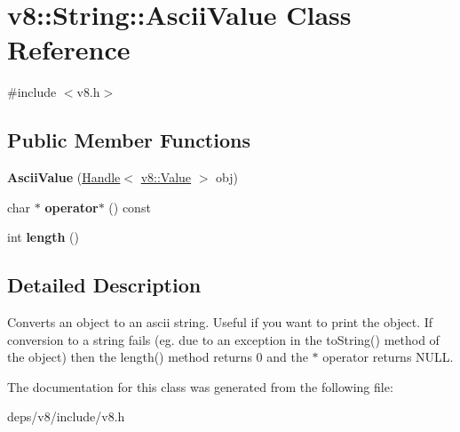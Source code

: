 \hypertarget{classv8_1_1_string_1_1_ascii_value}{}\section{v8\+:\+:String\+:\+:Ascii\+Value Class Reference}
\label{classv8_1_1_string_1_1_ascii_value}


{\ttfamily \#include $<$v8.\+h$>$}

\subsection*{Public Member Functions}
\begin{DoxyCompactItemize}
\item 
\hypertarget{classv8_1_1_string_1_1_ascii_value_a57cc7956658fe389a7232d4843caf3d0}{}{\bfseries Ascii\+Value} (\hyperlink{classv8_1_1_handle}{Handle}$<$ \hyperlink{classv8_1_1_value}{v8\+::\+Value} $>$ obj)\label{classv8_1_1_string_1_1_ascii_value_a57cc7956658fe389a7232d4843caf3d0}

\item 
\hypertarget{classv8_1_1_string_1_1_ascii_value_ad369052abdda33fa43dc62a5f191c311}{}char $\ast$ {\bfseries operator$\ast$} () const \label{classv8_1_1_string_1_1_ascii_value_ad369052abdda33fa43dc62a5f191c311}

\item 
\hypertarget{classv8_1_1_string_1_1_ascii_value_a395ce7cb6dbbbab9dcad2c865984bbff}{}int {\bfseries length} ()\label{classv8_1_1_string_1_1_ascii_value_a395ce7cb6dbbbab9dcad2c865984bbff}

\end{DoxyCompactItemize}


\subsection{Detailed Description}
Converts an object to an ascii string. Useful if you want to print the object. If conversion to a string fails (eg. due to an exception in the to\+String() method of the object) then the length() method returns 0 and the $\ast$ operator returns N\+U\+L\+L. 

The documentation for this class was generated from the following file\+:\begin{DoxyCompactItemize}
\item 
deps/v8/include/v8.\+h\end{DoxyCompactItemize}

